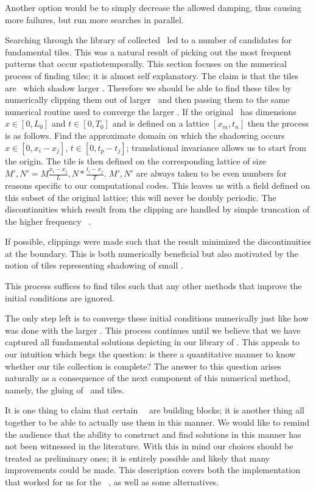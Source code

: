 \begin{itemize}
{Another option would be to simply decrease the allowed damping, thus causing more failures,
but run more searches in parallel.


Searching through the library of collected \twots\ led to a number of candidates
for fundamental tiles. This was a natural result of picking out the most frequent patterns
that occur spatiotemporally. This section focuses on the numerical process of finding tiles;
it is almost self explanatory. The claim is that the tiles are \twots\ which shadow larger \twots.
Therefore we should be able to find these tiles by numerically clipping them out of larger \twots\
and then passing them to the same numerical routine used to converge the larger \twot. If
the original \twot\ has dimensions $x \in [0, L_0]$ and $t \in [0, T_0]$ and is defined on
a lattice $[x_m, t_n]$ then the process is as follows. Find the approximate domain on which
the shadowing occurs $x \in [0, x_{i}-x_{j}]$, $t \in [0, t_{p}-t_{j}]$; translational invariance allows
us to start from the origin. The tile is then defined on the corresponding lattice of size
$M', N' = M \frac{x_{i}-x_{j}}{L}, N * \frac{t_{i}-x_{j}}{T}$.
$M', N'$ are always taken to be even numbers for reasons specific to our computational codes.
This leaves us with a field defined on this subset of the original lattice;
this will never be doubly periodic. The discontinuities which result from
the clipping are handled by simple truncation of the higher
frequency \spt\ \Fcs.

If possible, clippings were made such that the result minimized the discontinuities at
the boundary. This is both numerically beneficial but also motivated by the notion
of tiles representing shadowing of small \twots.

This process suffices to find tiles such that any other methods that
improve the initial conditions are ignored.

The only step left is to converge these initial conditions numerically
just like how was done with the larger \twots.
This process continues until we believe that we have captured all
fundamental solutions depicting in our library of \twots.
This appeals to our intuition which begs the question: is there a quantitative
manner to know whether our tile collection is complete? The answer to this
question arises naturally as a consequence of the next component of this numerical method,
namely, the gluing of \twots\ and tiles.


It is one thing to claim that certain \spt\ \twots\ are building blocks; it is
another thing all together to be able to actually use them in this manner. We would like to
remind the audience that the ability to construct and find solutions in this manner
has not been witnessed in the literature. With this in mind our choices should
be treated as preliminary ones; it is entirely possible and likely that
many improvements could be made. This
description covers both the implementation that worked for us for the \spt\ \KSe,
as well as some alternatives.

}
\end{itemize}
